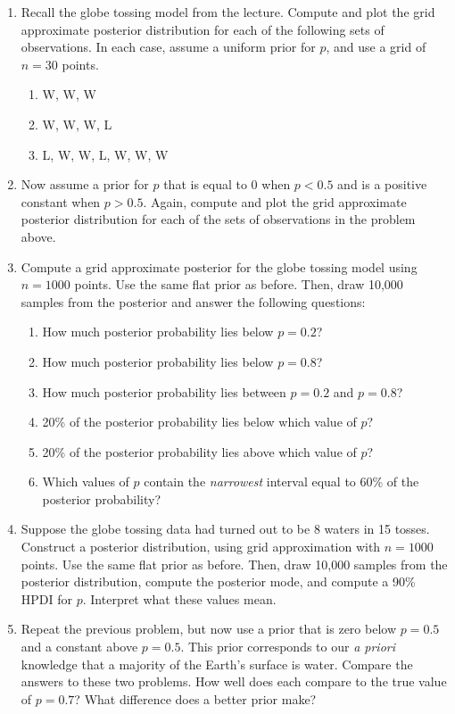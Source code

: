 \documentclass[10pt]{article}
\begin{document}
\begin{enumerate}
  
\item Recall the globe tossing model from the lecture.  Compute and plot the grid approximate posterior distribution for each of the following sets of observations.  In each case, assume a uniform prior for $p$, and use a grid of $n=30$ points.
  \begin{enumerate}
  \item W, W, W
  \item W, W, W, L
  \item L, W, W, L, W, W, W
  \end{enumerate}

\item Now assume a prior for $p$ that is equal to 0 when $p<0.5$ and is a positive constant when $p>0.5$.  Again, compute and plot the grid approximate posterior distribution for each of the sets of observations in the problem above.

\item Compute a grid approximate posterior for the globe tossing model using $n=1000$ points.  Use the same flat prior as before.  Then, draw 10,000 samples from the posterior and answer the following questions:
  \begin{enumerate}
  \item How much posterior probability lies below $p=0.2$?
  \item How much posterior probability lies below $p=0.8$?
  \item How much posterior probability lies between $p=0.2$ and $p=0.8$?
  \item 20\% of the posterior probability lies below which value of $p$?
  \item 20\% of the posterior probability lies above which value of $p$?
    \item Which values of $p$ contain the \emph{narrowest} interval equal to 60\% of the posterior probability?
    \end{enumerate}

  \item Suppose the globe tossing data had turned out to be 8 waters in 15 tosses.  Construct a posterior distribution, using grid approximation with $n=1000$ points.  Use the same flat prior as before.  Then, draw 10,000 samples from the posterior distribution, compute the posterior mode, and compute a 90\% HPDI for $p$.  Interpret what these values mean.

    \item Repeat the previous problem, but now use a prior that is zero below $p=0.5$ and a constant above $p=0.5$.  This prior corresponds to our \emph{a priori} knowledge that a majority of the Earth's surface is water.  Compare the answers to these two problems.  How well does each compare to the true value of $p=0.7$?  What difference does a better prior make?  
\end{enumerate}  
\end{document}
